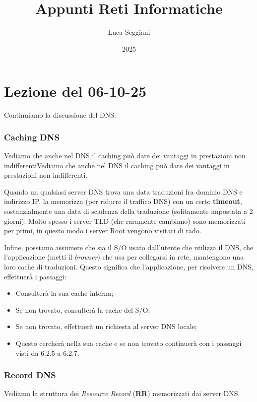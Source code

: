 \documentclass[a4paper,11pt]{article}
\title{Appunti Reti Informatiche}
\author{Luca Seggiani}
\date{2025}
\begin{document}
\section{Lezione del 06-10-25}

\thispagestyle{empty}
\pagestyle{fancy}

Continuiamo la discussione del DNS.

\subsubsection{Caching DNS}
Vediamo che anche nel DNS il caching può dare dei vantaggi in prestazioni non indifferentiVediamo che anche nel DNS il caching può dare dei vantaggi in prestazioni non indifferenti.

Quando un qualsiasi server DNS trova una data traduzioni fra dominio DNS e indirizzo IP, la memorizza (per ridurre il traffico DNS) con un certo \textbf{timeout}, sostanzialmente una data di scadenza della traduzione (solitamente impostata a 2 giorni).
Molto spesso i server TLD (che raramente cambiano) sono memorizzati per primi, in questo modo i server Root vengono visitati di rado.

Infine, possiamo assumere che sia il S/O usato dall'utente che utilizza il DNS, che l'applicazione (metti il \textit{browser}) che usa per collegarsi in rete, mantengono una loro cache di traduzioni. 
Questo significa che l'applicazione, per risolvere un DNS, effettuerà i passaggi:
\begin{itemize}
	\item Consulterà la sua cache interna;
	\item Se non trovato, consulterà la cache del S/O;
	\item Se non trovato, effettuerà un richiesta al server DNS locale;
	\item Questo cercherà nella sua cache e se non trovato continuerà con i passaggi visti da 6.2.5 a 6.2.7.
\end{itemize}

\subsubsection{Record DNS}
Vediamo la struttura dei \textit{Resource Record} (\textbf{RR}) memorizzati dai server DNS.
\end{document}

